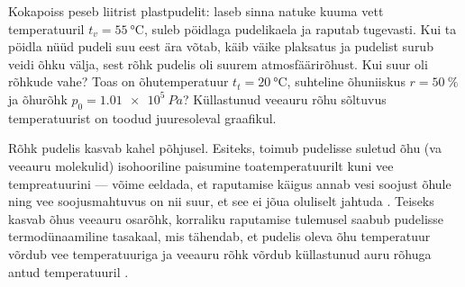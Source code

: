 
Kokapoiss peseb liitrist plastpudelit: laseb sinna natuke kuuma vett temperatuuril $t_v=\qty{55}{\celsius}$, suleb pöidlaga pudelikaela ja raputab tugevasti. Kui ta pöidla nüüd pudeli suu eest ära võtab, käib väike plaksatus ja pudelist surub veidi õhku välja, sest rõhk pudelis oli suurem atmosfäärirõhust. Kui suur oli rõhkude vahe? Toas on õhutemperatuur $t_t=\qty{20}{\celsius}$, suhteline õhuniiskus $r=\qty{50}{\percent}$ ja õhurõhk $p_0=\SI{1.01e5}{Pa}$? Küllastunud veeauru rõhu sõltuvus temperatuurist on toodud juuresoleval graafikul.
\begin{figure}[h]
  \vspace{-0.5em}
  {
  }
  \vspace{-1em}
\end{figure}


\hint

\solu
Rõhk pudelis kasvab kahel põhjusel. Esiteks, toimub pudelisse suletud õhu (va veeauru molekulid) isohooriline paisumine toatemperatuurilt kuni vee tempreatuurini --- võime eeldada, et raputamise käigus annab vesi soojust õhule ning vee soojusmahtuvus on nii suur, et see ei jõua oluliselt jahtuda . Teiseks kasvab õhus veeauru osarõhk, korraliku raputamise tulemusel saabub pudelisse termodünaamiline tasakaal, mis tähendab, et pudelis oleva õhu temperatuur võrdub vee temperatuuriga ja veeauru rõhk võrdub küllastunud auru rõhuga antud temperatuuril .

